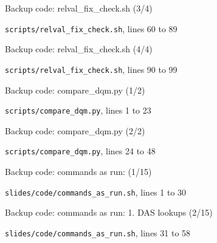 \begin{frame}{Backup code: relval\_fix\_check.sh (3/4)}
  \vspace{0pt}\par
  {\tiny\color{lightgrey}\texttt{scripts/relval\_fix\_check.sh}, lines 60 to 89\par}
  
\end{frame}
\begin{frame}{Backup code: relval\_fix\_check.sh (4/4)}
  \vspace{0pt}\par
  {\tiny\color{lightgrey}\texttt{scripts/relval\_fix\_check.sh}, lines 90 to 99\par}
  
\end{frame}
\begin{frame}{Backup code: compare\_dqm.py (1/2)}
  \vspace{0pt}\par
  {\tiny\color{lightgrey}\texttt{scripts/compare\_dqm.py}, lines 1 to 23\par}
  
\end{frame}
\begin{frame}{Backup code: compare\_dqm.py (2/2)}
  \vspace{0pt}\par
  {\tiny\color{lightgrey}\texttt{scripts/compare\_dqm.py}, lines 24 to 48\par}
  
\end{frame}
\begin{frame}{Backup code: commands as run:  (1/15)}
  \vspace{0pt}\par
  {\tiny\color{lightgrey}\texttt{slides/code/commands\_as\_run.sh}, lines 1 to 30\par}
  
\end{frame}
\begin{frame}{Backup code: commands as run: 1. DAS lookups (2/15)}
  \vspace{0pt}\par
  {\tiny\color{lightgrey}\texttt{slides/code/commands\_as\_run.sh}, lines 31 to 58\par}
  
\end{frame}
